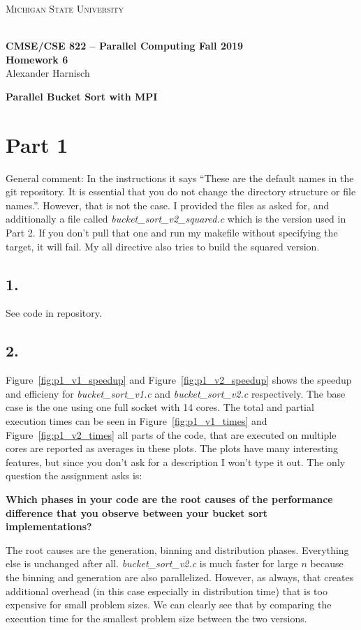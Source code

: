 \documentclass[a4paper, 11pt]{article}
\begin{document}
\noindent
\centerline{\small{\textsc{Michigan State University}}} \\
\large{\textbf{CMSE/CSE 822 – Parallel Computing \hfill Fall 2019 \\
Homework 6}} \\
Alexander Harnisch \\
\noindent\makebox[\linewidth]{\rule{\textwidth}{0.4pt}}

{\noindent\Large{\textbf{Parallel Bucket Sort with MPI}}}
\section*{Part 1}
General comment: In the instructions it says ``These are the default names in
the git repository. It is essential that you do not change the directory
structure or file names.''. However, that is not the case. I provided the files
as asked for, and additionally a file called
\textit{bucket\_sort\_v2\_squared.c} which is the version used in Part 2. If
you don't pull that one and run my makefile without specifying the target, it
will fail. My all directive also tries to build the squared version.

\subsection*{1.}
See code in repository.

\subsection*{2.}
Figure~\ref{fig:p1_v1_speedup} and Figure~\ref{fig:p1_v2_speedup} shows the
speedup and efficieny for \textit{bucket\_sort\_v1.c} and
\textit{bucket\_sort\_v2.c} respectively. The base case is the one using one
full socket with 14 cores. The total and partial execution times can be seen in
Figure~\ref{fig:p1_v1_times} and Figure~\ref{fig:p1_v2_times} all parts of the
code, that are executed on multiple cores are reported as averages in these
plots. The plots have many interesting features, but since you don't ask for a
description I won't type it out. The only question the assignment asks is:

\textbf{Which phases in your code are
the root causes of the performance difference that you observe between your
bucket sort implementations?}

The root causes are the generation, binning and distribution phases. Everything
else is unchanged after all. \textit{bucket\_sort\_v2.c} is much faster for
large $n$ because the binning and generation are also parallelized. However, as
always, that creates additional overhead (in this case especially in
distribution time) that is too expensive for small problem sizes. We can
clearly see that by comparing the execution time for the smallest problem size
between the two versions. 
\end{document}

